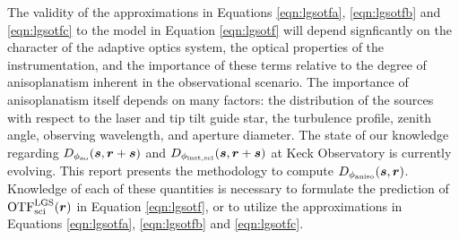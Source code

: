 The validity of the approximations in Equations \ref{eqn:lgsotfa},
\ref{eqn:lgsotfb} and \ref{eqn:lgsotfc} to the model in Equation \ref{eqn:lgsotf}
will depend signficantly on the character of the adaptive optics
system, the optical properties of the instrumentation, and the
importance of these terms relative to the degree of anisoplanatism
inherent in the observational scenario.  The importance of
anisoplanatism itself depends on many factors: the distribution of the
sources with respect to the laser and tip tilt guide star, the
turbulence profile, zenith angle, observing wavelength, and aperture
diameter.  The state of our knowledge regarding $D_{\rm
  \phi_{ao}}(\boldsymbol{s},\boldsymbol{r} + \boldsymbol{s})$ and
$D_{\rm \phi_{inst,sci}}(\boldsymbol{s},\boldsymbol{r} +
\boldsymbol{s})$ at Keck Observatory is currently evolving.  This
report presents the methodology to compute $D_{\rm
  \phi_{aniso}}(\boldsymbol{s},\boldsymbol{r})$.  Knowledge of each of
these quantities is necessary to formulate the prediction of
${\rm OTF}^{\rm LGS}_{\rm sci}(\boldsymbol{r})$ in Equation \ref{eqn:lgsotf}, or to
utilize the approximations in Equations \ref{eqn:lgsotfa}, \ref{eqn:lgsotfb}
and \ref{eqn:lgsotfc}.

